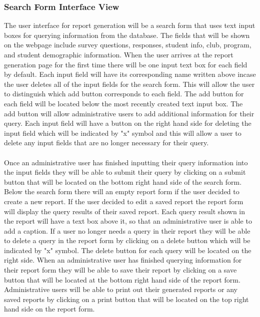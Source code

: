 \documentclass[letterpaper,10pt,serif, draftclsnofoot,onecolumn, compsoc, titlepage]{IEEEtran}
\begin{document}
\subsubsection{Search Form Interface View}
The user interface for report generation will be a search form that uses text input boxes for querying information from the database. The fields that will be shown on the webpage include survey questions, responses, student info, club, program, and student demographic information. When the user arrives at the report generation page for the first time there will be one input text box for each field by default. Each input field will have its corresponding name written above incase the user deletes all of the input fields for the search form. This will allow the user to distinguish which add button corresponds to each field. The add button for each field will be located below the most recently created text input box. The add button will allow administrative users to add additional information for their query. Each input field will have a button on the right hand side for deleting the input field which will be indicated by "x" symbol and this will allow a user to delete any input fields that are no longer necessary for their query. 
\\ \\
Once an administrative user has finished inputting their query information into the input fields they will be able to submit their query by clicking on a submit button that will be located on the bottom right hand side of the search form. Below the search form there will an empty report form if the user decided to create a new report. If the user decided to edit a saved report the report form will display the query results of their saved report. Each query result shown in the report will have a text box above it, so that an administrative user is able to add a caption. If a user no longer needs a query in their report they will be able to delete a query in the report form by clicking on a delete button which will be indicated by "x" symbol. The delete button for each query will be located on the right side. When an administrative user has finished querying information for their report form they will be able to save their report by clicking on a save button that will be located at the bottom right hand side of the report form. Administrative users will be able to print out their generated reports or any saved reports by clicking on a print button that will be located on the top right hand side on the report form. 
\end{document}
